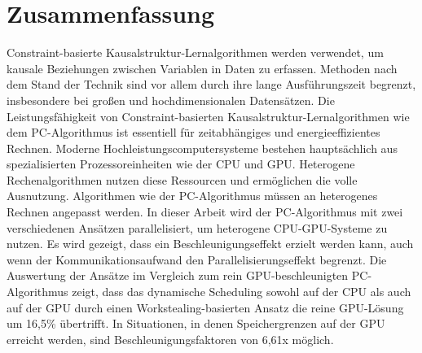 \chapter*{Zusammenfassung}
Constraint-basierte Kausalstruktur-Lernalgorithmen werden verwendet, um kausale Beziehungen zwischen Variablen in Daten zu erfassen. Methoden nach dem Stand der Technik sind vor allem durch ihre lange Ausführungszeit begrenzt, insbesondere bei großen und hochdimensionalen Datensätzen. Die Leistungsfähigkeit von Constraint-basierten Kausalstruktur-Lernalgorithmen wie dem PC-Algorithmus ist essentiell für zeitabhängiges und energieeffizientes Rechnen. Moderne Hochleistungscomputersysteme bestehen hauptsächlich aus spezialisierten Prozessoreinheiten wie der CPU und GPU. Heterogene Rechenalgorithmen nutzen diese Ressourcen und ermöglichen die volle Ausnutzung. Algorithmen wie der PC-Algorithmus müssen an heterogenes Rechnen angepasst werden. In dieser Arbeit wird der PC-Algorithmus mit zwei verschiedenen Ansätzen parallelisiert, um heterogene CPU-GPU-Systeme zu nutzen. Es wird gezeigt, dass ein Beschleunigungseffekt erzielt werden kann, auch wenn der Kommunikationsaufwand den Parallelisierungseffekt begrenzt. Die Auswertung der Ansätze im Vergleich zum rein GPU-beschleunigten PC-Algorithmus zeigt, dass das dynamische Scheduling sowohl auf der CPU als auch auf der GPU durch einen Workstealing-basierten Ansatz die reine GPU-Lösung um 16,5\% übertrifft. In Situationen, in denen Speichergrenzen auf der GPU erreicht werden, sind Beschleunigungsfaktoren von 6,61x möglich.
